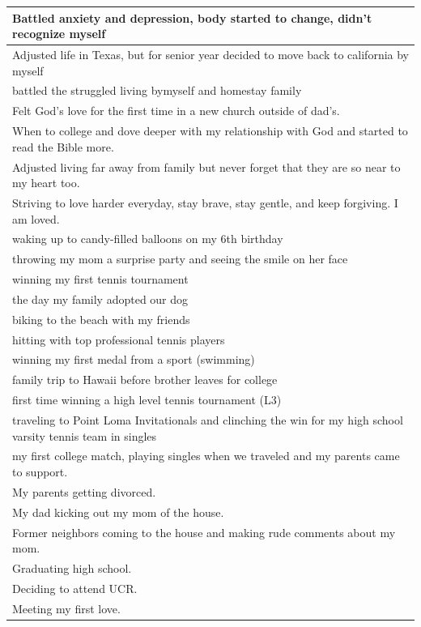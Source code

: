 \documentclass[
  .7em,
  letterpaper,
  DIV=11,
  numbers=noendperiod]{scrartcl}
\begin{document}
\begin{table}
\begin{tabular}{l}
\hline
Battled anxiety and depression, body started to change, didn't recognize myself\\
\hline
Adjusted life in Texas, but for senior year decided to move back to california by myself\\
\hline
battled the struggled living bymyself and homestay family\\
\hline
Felt God's love for the first time in a new church outside of dad's.\\
\hline
When to college and dove deeper with my relationship with God and started to read the Bible more.\\
\hline
Adjusted living far away from family but never forget that they are so near to my heart too.\\
\hline
Striving to love harder everyday, stay brave, stay gentle, and keep forgiving. I am loved.\\
\hline
waking up to candy-filled balloons on my 6th birthday\\
\hline
throwing my mom a surprise party and seeing the smile on her face\\
\hline
winning my first tennis tournament\\
\hline
the day my family adopted our dog\\
\hline
biking to the beach with my friends\\
\hline
hitting with top professional tennis players\\
\hline
winning my first medal from a sport (swimming)\\
\hline
family trip to Hawaii before brother leaves for college\\
\hline
first time winning a high level tennis tournament (L3)\\
\hline
traveling to Point Loma Invitationals and clinching the win for my high school varsity tennis team in singles\\
\hline
my first college match, playing singles when we traveled and my parents came to support.\\
\hline
My parents getting divorced.\\
\hline
My dad kicking out my mom of the house.\\
\hline
Former neighbors coming to the house and making rude comments about my mom.\\
\hline
Graduating high school.\\
\hline
Deciding to attend UCR.\\
\hline
Meeting my first love.\\
\hline

\end{tabular}
\end{table}
\end{document}
